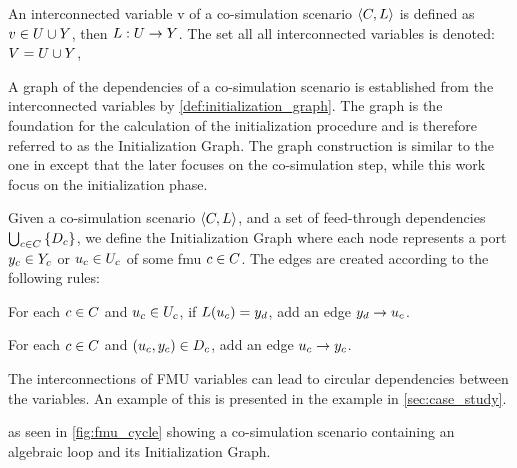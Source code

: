 \begin{definition}
An interconnected variable v of a co-simulation scenario $ \left\langle C, L \right\rangle $ is defined as $v \in U \cup Y$, then $L : U \to Y$.
The set all all interconnected variables is denoted: $V = U \cup Y$,
\end{definition}

A graph of the dependencies of a co-simulation scenario is established from the interconnected variables by \cref{def:initialization_graph}. The graph is the foundation for the calculation of the initialization procedure and is therefore referred to as the Initialization Graph. The graph construction is similar to the one in \cite{Gomes2019c} except that the later focuses on the co-simulation step, while this work focus on the initialization phase.

\begin{definition}\label{def:initialization_graph}
  Given a co-simulation scenario $ \left\langle C, L \right\rangle $, and a set of feed-through dependencies $\bigcup_{c \in C}  \left\{ D_{c} \right\}$, we define the Initialization Graph where each node represents a port $y_{c} \in Y_{c}$ or $u_{c} \in U_{c}$ of some fmu $c \in C$. The edges are created according to the following rules:
  \begin{compactenum}
    \item For each $c \in C$ and $u_{c} \in U_{c}$, if $L(u_{c}) = y_{d}$, add an edge $y_{d} -> u_{c}$.
    \item For each $c \in C$ and $(u_{c},y_{c}) \in D_{c}$, add an edge $u_{c} -> y_{c}$.
  \end{compactenum}
\end{definition}

The interconnections of FMU variables can lead to circular dependencies between the variables. An example of this is presented in the example in \cref{sec:case_study}.

as seen in \cref{fig:fmu_cycle} showing a co-simulation scenario containing an algebraic loop and its Initialization Graph.

